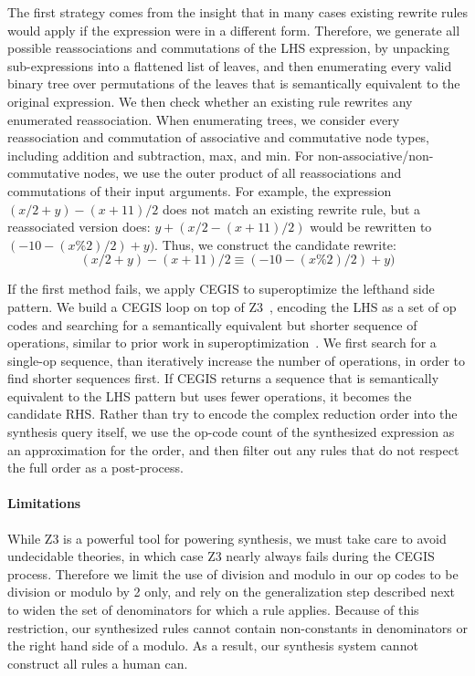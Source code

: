 \documentclass[sigplan,10pt,review,anonymous]{acmart}\settopmatter{printfolios=true,printccs=false,printacmref=false}
\begin{document}
The first strategy comes from the insight that in many cases existing rewrite rules would apply
if the expression were in a different form.  Therefore, we generate all possible
reassociations and commutations of the LHS expression, by unpacking sub-expressions
into a flattened list of leaves, and then enumerating every valid binary
tree over permutations of the leaves that is semantically equivalent to the original
expression.  We then check whether an existing rule rewrites any enumerated reassociation.
When enumerating trees, we consider every reassociation and commutation
of associative and commutative node types, including addition and subtraction, max, and
min.  For non-associative/non-commutative nodes, we use the outer product of all reassociations
and commutations of their input arguments.  For example, the expression $(x/2 + y) - (x + 11)/2$
does not match an existing rewrite rule, but a reassociated version does: $y + (x/2 - (x + 11)/2)$
would be rewritten to $(-10 - (x \% 2)/2) + y)$.  Thus, we construct the candidate rewrite:
$$(x/2 + y) - (x + 11)/2 \equiv (-10 - (x \% 2)/2) + y)$$

If the first method fails, we apply CEGIS to superoptimize the lefthand side pattern.
We build a CEGIS loop on top of Z3~\cite{de2008z3}, encoding the LHS as a set of op codes
and searching for a semantically equivalent but shorter sequence of operations, similar
to prior work in superoptimization~\cite{regehr2018superoptimization, mangpo2016superoptimization}.
We first search for a single-op sequence,
than iteratively increase the number of operations, in order to find shorter sequences
first.  If CEGIS returns a sequence that is semantically equivalent to the LHS pattern but uses fewer
operations, it becomes the candidate RHS. Rather than try to encode the complex reduction order into the synthesis query itself, we use the op-code count of the synthesized expression as an approximation for the order, and then filter out any rules that do not respect the full order as a post-process. 

\paragraph{Limitations} While Z3 is a powerful tool for powering synthesis, we must take care to avoid
undecidable theories, in which case Z3 nearly always fails during the CEGIS process.
Therefore we limit the use of division and modulo in our op codes to be division
or modulo by 2 only, and rely on the generalization step described next to
widen the set of denominators for which a rule applies.  Because of this
restriction, our synthesized rules cannot contain non-constants in denominators
or the right hand side of a modulo.  As a result, our synthesis system cannot
construct all rules a human can.
\end{document}
